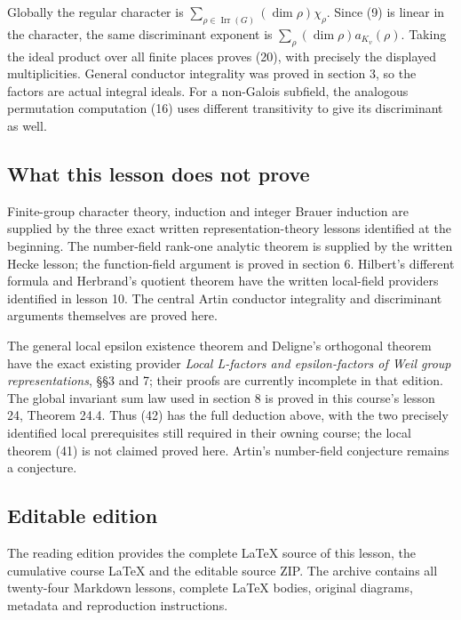 \documentclass[11pt,a4paper]{article}
\begin{document}
Globally the regular character is
\(\sum_{\rho\in\operatorname{Irr}(G)}(\dim\rho)\chi_\rho\). Since (9) is
linear in the character, the same discriminant exponent is
\(\sum_\rho(\dim\rho)a_{K_v}(\rho)\). Taking the ideal product over all
finite places proves (20), with precisely the displayed multiplicities.
General conductor integrality was proved in section 3, so the factors
are actual integral ideals. For a non-Galois subfield, the analogous
permutation computation (16) uses different transitivity to give its
discriminant as well.

\subsection{What this lesson does not
prove}\label{what-this-lesson-does-not-prove}

Finite-group character theory, induction and integer Brauer induction
are supplied by the three exact written representation-theory lessons
identified at the beginning. The number-field rank-one analytic theorem
is supplied by the written Hecke lesson; the function-field argument is
proved in section 6. Hilbert's different formula and Herbrand's quotient
theorem have the written local-field providers identified in lesson 10.
The central Artin conductor integrality and discriminant arguments
themselves are proved here.

The general local epsilon existence theorem and Deligne's orthogonal
theorem have the exact existing provider \emph{Local L-factors and
epsilon-factors of Weil group representations}, §§3 and 7; their proofs
are currently incomplete in that edition. The global invariant sum law
used in section 8 is proved in this course's lesson 24, Theorem 24.4.
Thus (42) has the full deduction above, with the two precisely
identified local prerequisites still required in their owning course;
the local theorem (41) is not claimed proved here. Artin's number-field
conjecture remains a conjecture.

\subsection{Editable edition}\label{editable-edition}

The reading edition provides the complete LaTeX source of this lesson,
the cumulative course LaTeX and the editable source ZIP. The archive
contains all twenty-four Markdown lessons, complete LaTeX bodies,
original diagrams, metadata and reproduction instructions.
\end{document}
